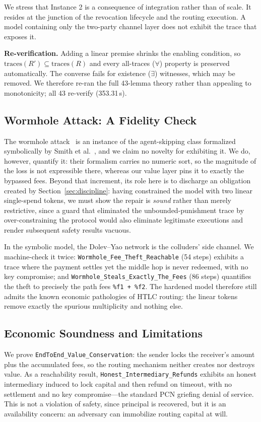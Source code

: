 \documentclass[sigconf,review]{acmart}
\theoremstyle{acmdefinition}
\begin{document}
We stress that Instance 2 is a consequence of integration rather than of scale. It resides at the junction of the revocation lifecycle and the routing execution. A model containing only the two-party channel layer does not exhibit the trace that exposes it.

\textbf{Re-verification.} Adding a linear premise shrinks the enabling condition, so $\mathrm{traces}(R') \subseteq \mathrm{traces}(R)$ and every all-traces ($\forall$) property is preserved automatically. The converse fails for existence ($\exists$) witnesses, which may be removed. We therefore re-ran the full 43-lemma theory rather than appealing to monotonicity; all 43 re-verify (353.31\,s).

\subsection{Wormhole Attack: A Fidelity Check}
The wormhole attack~\cite{malavolta2019anonymous} is an instance of the agent-skipping class formalized symbolically by Smith et al.~\cite{smith2022modelling}, and we claim no novelty for exhibiting it. We do, however, quantify it: their formalism carries no numeric sort, so the magnitude of the loss is not expressible there, whereas our value layer pins it to exactly the bypassed fees. Beyond that increment, its role here is to discharge an obligation created by Section~\ref{sec:discipline}: having constrained the model with two linear single-spend tokens, we must show the repair is \emph{sound} rather than merely restrictive, since a guard that eliminated the unbounded-punishment trace by over-constraining the protocol would also eliminate legitimate executions and render subsequent safety results vacuous.

In the symbolic model, the Dolev--Yao network is the colluders' side channel. We machine-check it twice: \texttt{Wormhole\_Fee\_Theft\_Reachable} (54 steps) exhibits a trace where the payment settles yet the middle hop is never redeemed, with no key compromise; and \texttt{Wormhole\_Steals\_Exactly\_The\_Fees} (86 steps) quantifies the theft to precisely the path fees \texttt{\%f1 + \%f2}. The hardened model therefore still admits the known economic pathologies of HTLC routing: the linear tokens remove exactly the spurious multiplicity and nothing else.

\subsection{Economic Soundness and Limitations}
We prove \texttt{EndToEnd\_Value\_Conservation}: the sender locks the receiver's amount plus the accumulated fees, so the routing mechanism neither creates nor destroys value. As a reachability result, \texttt{Honest\_Intermediary\_Refunds} exhibits an honest intermediary induced to lock capital and then refund on timeout, with no settlement and no key compromise---the standard PCN griefing denial of service. This is not a violation of safety, since principal is recovered, but it is an availability concern: an adversary can immobilize routing capital at will.
\end{document}
